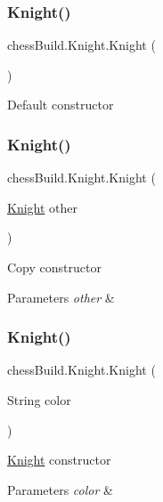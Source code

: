 \subsubsection{\texorpdfstring{Knight()}{Knight()}\hspace{0.1cm}{\footnotesize\ttfamily [1/4]}}
{\footnotesize\ttfamily chess\+Build.\+Knight.\+Knight (\begin{DoxyParamCaption}{ }\end{DoxyParamCaption})}

Default constructor \mbox{\label{classchess_build_1_1_knight_ad282a386bcf3eb2550bb0ddbaedb4fef}} 
\subsubsection{\texorpdfstring{Knight()}{Knight()}\hspace{0.1cm}{\footnotesize\ttfamily [2/4]}}
{\footnotesize\ttfamily chess\+Build.\+Knight.\+Knight (\begin{DoxyParamCaption}\item[{\hyperlink{classchess_build_1_1_knight}{Knight}}]{other }\end{DoxyParamCaption})}

Copy constructor 
\begin{DoxyParams}{Parameters}
{\em other} & \\
\hline
\end{DoxyParams}
\mbox{\label{classchess_build_1_1_knight_a52b03f556c615328116b62f3f2c4bb0a}} 
\subsubsection{\texorpdfstring{Knight()}{Knight()}\hspace{0.1cm}{\footnotesize\ttfamily [3/4]}}
{\footnotesize\ttfamily chess\+Build.\+Knight.\+Knight (\begin{DoxyParamCaption}\item[{String}]{color }\end{DoxyParamCaption})}

\hyperlink{classchess_build_1_1_knight}{Knight} constructor 
\begin{DoxyParams}{Parameters}
{\em color} & \\
\hline
\end{DoxyParams}
\mbox{\label{classchess_build_1_1_knight_af9b14f7aa9226db9fa45b15f1f0cce62}} 
